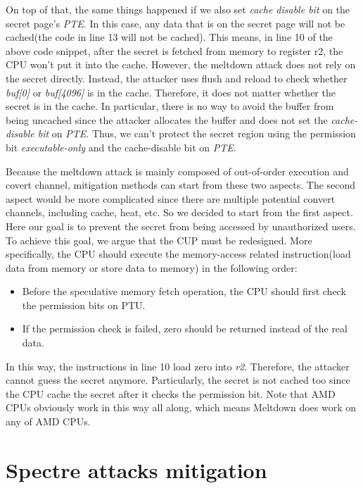   On top of that, the same things happened if we also set \emph{cache disable bit} 
  on the secret page's \emph{PTE}.  In this case, any data 
  that is on the secret page will not be cached(the code in line 
  13 will not be cached).  This means,  in line 10 of the above code snippet, 
  after the secret is fetched from memory to register r2, the CPU won't 
  put it into the cache.  However, the meltdown attack does not rely on the 
  secret directly.  Instead, the attacker uses flush and reload to check 
  whether \emph{buf[0]} or \emph{buf[4096]} is in the cache. Therefore, it does not 
  matter whether the secret is in the cache.  In particular, there is no 
  way to avoid the buffer from being uncached since the attacker allocates 
  the buffer and does not set the \emph{cache-disable bit} on \emph{PTE}. Thus, we can't
   protect the secret region using the permission bit \emph{executable-only}
   and the cache-disable bit on \emph{PTE}.
  


  Because the meltdown attack is mainly composed of out-of-order 
  execution and covert channel, mitigation methods can start from 
  these two aspects. The second aspect would be more complicated 
  since there are multiple potential convert channels, including 
  cache, heat, etc.  So we decided to start from the first aspect. 
  Here our goal is to prevent the secret from being accessed by 
  unauthorized users. To achieve this goal, we argue that the CUP 
  must be redesigned.  More specifically, the CPU should execute 
  the memory-access related instruction(load data from memory or 
  store data to memory) in the following order\cite{3}:
  \begin{itemize}
    \item Before the speculative memory fetch operation, the CPU should first check the permission bits on PTU. 
    \item If the permission check is failed, zero should be returned instead of the real data.
  \end{itemize}
  In this way, the instructions in line 10 load zero into \emph{r2}. 
  Therefore, the attacker cannot guess the secret anymore. Particularly, the secret is not cached too since the CPU cache the secret after 
  it checks the permission bit. Note that AMD CPUs obviously work in
  this way all along, which means Meltdown does work on any of AMD CPUs\cite{26}.


\section{Spectre attacks mitigation}

